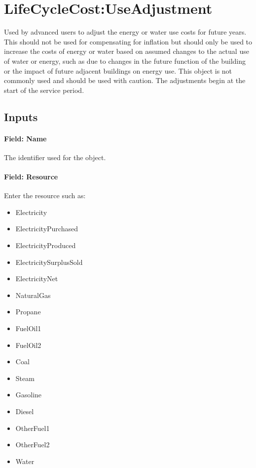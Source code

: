 \section{LifeCycleCost:UseAdjustment}\label{lifecyclecostuseadjustment}

Used by advanced users to adjust the energy or water use costs for future years. This should not be used for compensating for inflation but should only be used to increase the costs of energy or water based on assumed changes to the actual use of water or energy, such as due to changes in the future function of the building or the impact of future adjacent buildings on energy use. This object is not commonly used and should be used with caution. The adjustments begin at the start of the service period.

\subsection{Inputs}\label{inputs-060}

\paragraph{Field: Name}\label{field-name-058}

The identifier used for the object.

\paragraph{Field: Resource}\label{field-resource}

Enter the resource such as:

\begin{itemize}
\item
  Electricity
\item
  ElectricityPurchased
\item
  ElectricityProduced
\item
  ElectricitySurplusSold
\item
  ElectricityNet
\item
  NaturalGas
\item
  Propane
\item
  FuelOil1
\item
  FuelOil2
\item
  Coal
\item
  Steam
\item
  Gasoline
\item
  Diesel
\item
  OtherFuel1
\item
  OtherFuel2
\item
  Water
\end{itemize}


